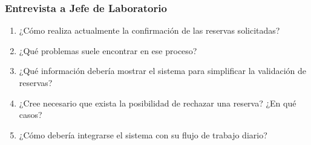 \documentclass[12pt, a4paper]{article}
\begin{document}
\subsubsection*{Entrevista a Jefe de Laboratorio}
\begin{enumerate}
\item ¿Cómo realiza actualmente la confirmación de las reservas solicitadas?
\item ¿Qué problemas suele encontrar en ese proceso?
\item ¿Qué información debería mostrar el sistema para simplificar la validación de reservas?
\item ¿Cree necesario que exista la posibilidad de rechazar una reserva? ¿En qué casos?
\item ¿Cómo debería integrarse el sistema con su flujo de trabajo diario?
\end{enumerate}
\end{document}
